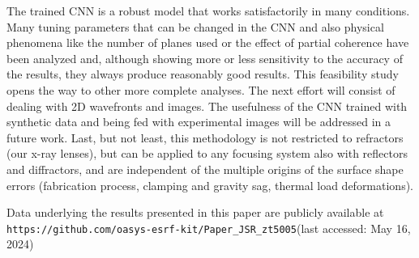 \documentclass[preprint]{iucr}
\newcommand{\inred}[1]{{\color{red}#1}}
\begin{document}
The trained CNN is a robust model that works satisfactorily in many conditions. Many tuning parameters that can be changed in the CNN and also physical phenomena like the number of planes used or the effect of partial coherence have been analyzed and, although showing more or less sensitivity to the accuracy of the results, they always produce reasonably good results. This feasibility study opens the way to other more complete analyses. The next effort will consist of dealing with 2D wavefronts and images.  
The usefulness of the CNN trained with synthetic data and being fed with  experimental images will be addressed in a future work.
\inred{Last, but not least, this methodology is not restricted to refractors (our x-ray lenses), but can be applied to any focusing system also with reflectors and diffractors, and are independent of the multiple origins of the surface shape errors (fabrication process, clamping and gravity sag, thermal load deformations). }








Data underlying the results presented in this paper are publicly available at \newline
\small{\texttt{https://github.com/oasys-esrf-kit/Paper\_JSR\_zt5005}}(last accessed: May 16, 2024)


\end{document}
